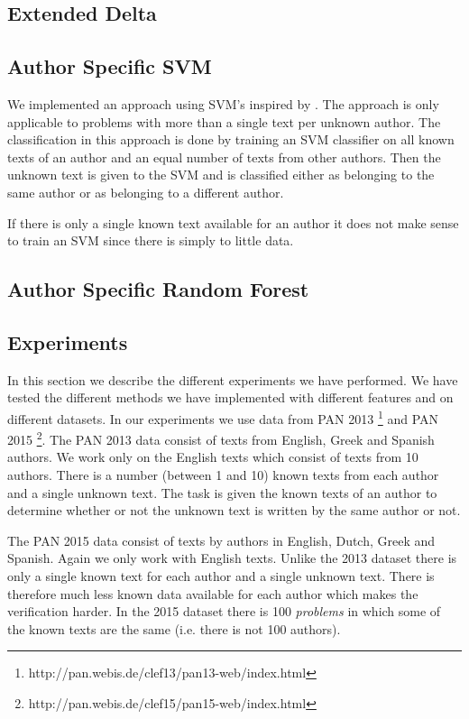 \subsection{Extended Delta}

\subsection{Author Specific SVM}
We implemented an approach using \gls{SVM}'s inspired by \cite{hansen2014}. The
approach is only applicable to problems with more than a single text per
unknown author. The classification in this approach is done by training an \gls{SVM}
classifier on all known texts of an author and an equal number of texts from
other authors. Then the unknown text is given to the \gls{SVM} and is classified
either as belonging to the same author or as belonging to a different author.

If there is only a single known text available for an author it does not make
sense to train an \gls{SVM} since there is simply to little data.

\subsection{Author Specific Random Forest}

\subsection{Experiments}
In this section we describe the different experiments we have performed.
We have tested the different methods we have implemented with different
features and on different datasets. In our experiments we use data from PAN
2013 \footnote{http://pan.webis.de/clef13/pan13-web/index.html} and PAN 2015
\footnote{http://pan.webis.de/clef15/pan15-web/index.html}. The PAN 2013 data
consist of texts from English, Greek and Spanish authors. We work only on the
English texts which consist of texts from 10 authors. There is a number (between
1 and 10) known texts from each author and a single unknown text. The task is
given the known texts of an author to determine whether or not the unknown text
is written by the same author or not.

The PAN 2015 data consist of texts by authors in English, Dutch, Greek and
Spanish. Again we only work with English texts. Unlike the 2013 dataset there is
only a single known text for each author and a single unknown text. There is
therefore much less known data available for each author which makes the
verification harder. In the 2015 dataset there is 100 \textit{problems} in which
some of the known texts are the same (i.e. there is not 100 authors).

